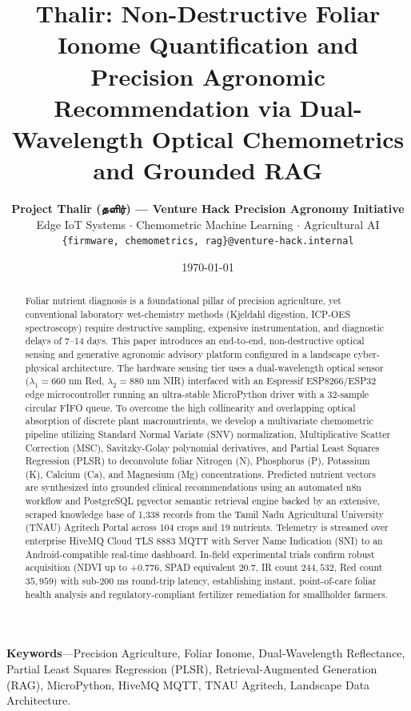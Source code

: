 \documentclass[9pt,twocolumn,a4paper,landscape]{article}
\title{\textbf{\Large Thalir: Non-Destructive Foliar Ionome Quantification and Precision Agronomic Recommendation via Dual-Wavelength Optical Chemometrics and Grounded RAG}}
\author{
    \textbf{Project Thalir (தளிர்) — Venture Hack Precision Agronomy Initiative} \\
    Edge IoT Systems $\cdot$ Chemometric Machine Learning $\cdot$ Agricultural AI \\
    \texttt{\{firmware, chemometrics, rag\}@venture-hack.internal}
}
\date{\today}
\begin{document}
\maketitle

\begin{abstract}
Foliar nutrient diagnosis is a foundational pillar of precision agriculture, yet conventional laboratory wet-chemistry methods (Kjeldahl digestion, ICP-OES spectroscopy) require destructive sampling, expensive instrumentation, and diagnostic delays of 7--14 days. This paper introduces an end-to-end, non-destructive optical sensing and generative agronomic advisory platform configured in a landscape cyber-physical architecture. The hardware sensing tier uses a dual-wavelength optical sensor ($\lambda_1 = 660\text{ nm}$ Red, $\lambda_2 = 880\text{ nm}$ NIR) interfaced with an Espressif ESP8266/ESP32 edge microcontroller running an ultra-stable MicroPython driver with a 32-sample circular FIFO queue. To overcome the high collinearity and overlapping optical absorption of discrete plant macronutrients, we develop a multivariate chemometric pipeline utilizing Standard Normal Variate (SNV) normalization, Multiplicative Scatter Correction (MSC), Savitzky-Golay polynomial derivatives, and Partial Least Squares Regression (PLSR) to deconvolute foliar Nitrogen (N), Phosphorus (P), Potassium (K), Calcium (Ca), and Magnesium (Mg) concentrations. Predicted nutrient vectors are synthesized into grounded clinical recommendations using an automated n8n workflow and PostgreSQL pgvector semantic retrieval engine backed by an extensive, scraped knowledge base of 1,338 records from the Tamil Nadu Agricultural University (TNAU) Agritech Portal across 104 crops and 19 nutrients. Telemetry is streamed over enterprise HiveMQ Cloud TLS 8883 MQTT with Server Name Indication (SNI) to an Android-compatible real-time dashboard. In-field experimental trials confirm robust acquisition (NDVI up to $+0.776$, SPAD equivalent $20.7$, IR count $244,532$, Red count $35,959$) with sub-$200\text{ ms}$ round-trip latency, establishing instant, point-of-care foliar health analysis and regulatory-compliant fertilizer remediation for smallholder farmers.
\end{abstract}

\textbf{Keywords}---Precision Agriculture, Foliar Ionome, Dual-Wavelength Reflectance, Partial Least Squares Regression (PLSR), Retrieval-Augmented Generation (RAG), MicroPython, HiveMQ MQTT, TNAU Agritech, Landscape Data Architecture.

\end{document}
